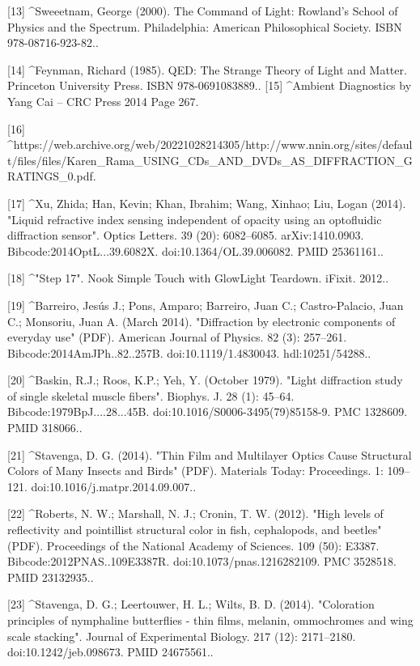 [13]
^Sweeetnam, George (2000). The Command of Light: Rowland's School of Physics and the Spectrum. Philadelphia: American Philosophical Society. ISBN 978-08716-923-82..

[14]
^Feynman, Richard (1985). QED: The Strange Theory of Light and Matter. Princeton University Press. ISBN 978-0691083889..
[15]
^Ambient Diagnostics by Yang Cai -- CRC Press 2014 Page 267.

[16]
^https://web.archive.org/web/20221028214305/http://www.nnin.org/sites/default/files/files/Karen_Rama_USING_CDs_AND_DVDs_AS_DIFFRACTION_GRATINGS_0.pdf.

[17]
^Xu, Zhida; Han, Kevin; Khan, Ibrahim; Wang, Xinhao; Liu, Logan (2014). "Liquid refractive index sensing independent of opacity using an optofluidic diffraction sensor". Optics Letters. 39 (20): 6082–6085. arXiv:1410.0903. Bibcode:2014OptL...39.6082X. doi:10.1364/OL.39.006082. PMID 25361161..

[18]
^"Step 17". Nook Simple Touch with GlowLight Teardown. iFixit. 2012..

[19]
^Barreiro, Jesús J.; Pons, Amparo; Barreiro, Juan C.; Castro-Palacio, Juan C.; Monsoriu, Juan A. (March 2014). "Diffraction by electronic components of everyday use" (PDF). American Journal of Physics. 82 (3): 257–261. Bibcode:2014AmJPh..82..257B. doi:10.1119/1.4830043. hdl:10251/54288..

[20]
^Baskin, R.J.; Roos, K.P.; Yeh, Y. (October 1979). "Light diffraction study of single skeletal muscle fibers". Biophys. J. 28 (1): 45–64. Bibcode:1979BpJ....28...45B. doi:10.1016/S0006-3495(79)85158-9. PMC 1328609. PMID 318066..

[21]
^Stavenga, D. G. (2014). "Thin Film and Multilayer Optics Cause Structural Colors of Many Insects and Birds" (PDF). Materials Today: Proceedings. 1: 109–121. doi:10.1016/j.matpr.2014.09.007..

[22]
^Roberts, N. W.; Marshall, N. J.; Cronin, T. W. (2012). "High levels of reflectivity and pointillist structural color in fish, cephalopods, and beetles" (PDF). Proceedings of the National Academy of Sciences. 109 (50): E3387. Bibcode:2012PNAS..109E3387R. doi:10.1073/pnas.1216282109. PMC 3528518. PMID 23132935..

[23]
^Stavenga, D. G.; Leertouwer, H. L.; Wilts, B. D. (2014). "Coloration principles of nymphaline butterflies - thin films, melanin, ommochromes and wing scale stacking". Journal of Experimental Biology. 217 (12): 2171–2180. doi:10.1242/jeb.098673. PMID 24675561..

